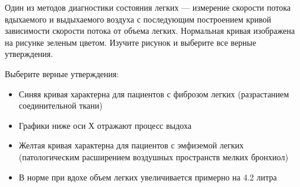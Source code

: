
Один из методов
диагностики состояния легких — измерение скорости потока вдыхаемого и
выдыхаемого воздуха с последующим построением кривой зависимости скорости
потока от объема легких. Нормальная кривая изображена на рисунке зеленым
цветом. Изучите рисунок и выберите все верные утверждения.


Выберите верные утверждения:

\begin{itemize}
    \item Синяя кривая характерна для пациентов с фиброзом легких (разрастанием соединительной ткани)
    \item Графики ниже оси Х отражают процесс выдоха
    \item Желтая кривая характерна для пациентов с эмфиземой легких (патологическим расширением воздушных пространств мелких бронхиол)
    \item В норме при вдохе объем легких увеличивается примерно на 4.2 литра
\end{itemize}



